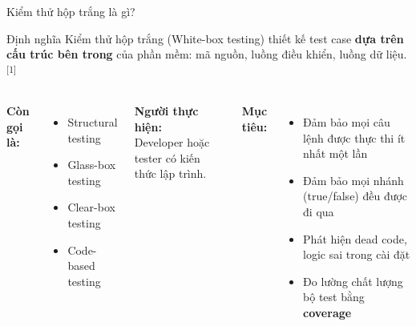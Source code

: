 \documentclass[aspectratio=169,12pt]{beamer}
\newcommand{\sref}[1]{\textsuperscript{\scriptsize[#1]}}
\begin{document}
\begin{frame}[shrink=10]{Kiểm thử hộp trắng là gì?}
  \begin{block}{Định nghĩa}
    Kiểm thử hộp trắng (White-box testing) thiết kế test case
    \textbf{dựa trên cấu trúc bên trong} của phần mềm:
    mã nguồn, luồng điều khiển, luồng dữ liệu.\sref{1}
  \end{block}

  \vspace{0.4em}
  \begin{columns}
    \textbf{Còn gọi là:}
    \begin{itemize}
      \item Structural testing
      \item Glass-box testing
      \item Clear-box testing
      \item Code-based testing
    \end{itemize}
    \vspace{0.4em}
    \textbf{Người thực hiện:}\\
    Developer hoặc tester có kiến thức lập trình.

    \textbf{Mục tiêu:}
    \begin{itemize}
      \item Đảm bảo mọi câu lệnh được thực thi ít nhất một lần
      \item Đảm bảo mọi nhánh (true/false) đều được đi qua
      \item Phát hiện dead code, logic sai trong cài đặt
      \item Đo lường chất lượng bộ test bằng \textbf{coverage}
    \end{itemize}
  \end{columns}
\end{frame}
\end{document}
